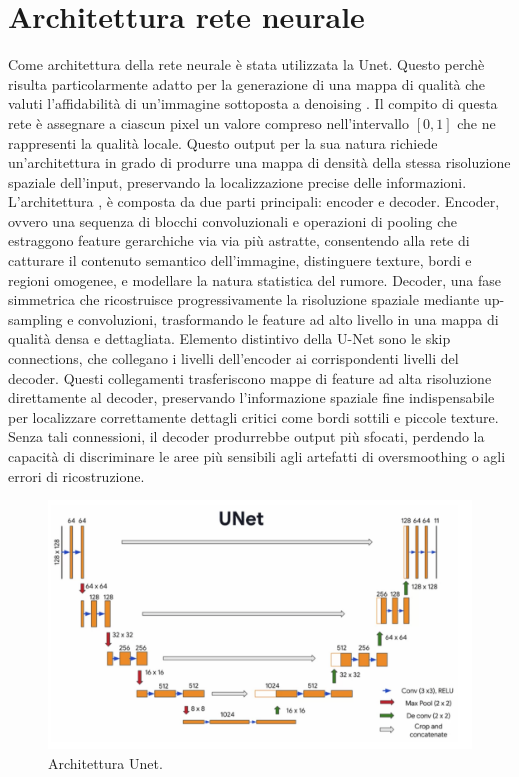 \section{Architettura rete neurale}
Come architettura della rete neurale è stata utilizzata la Unet. Questo perchè risulta particolarmente adatto per la 
generazione di una mappa di qualità che valuti l'affidabilità di un'immagine sottoposta a denoising \cite{Vyver2025}. Il compito di 
questa rete è assegnare a ciascun pixel un valore compreso nell'intervallo $[0,1]$ che ne rappresenti la 
qualità locale. Questo output per la sua natura richiede un'architettura in grado di produrre una mappa di densità 
della stessa risoluzione spaziale dell'input, preservando la localizzazione precise delle informazioni. 
L'architettura \cite{ronneberger2015unetconvolutionalnetworksbiomedical}, è composta da due parti principali: encoder e decoder. 
Encoder, ovvero una sequenza di blocchi convoluzionali e operazioni di pooling che estraggono feature 
gerarchiche via via più astratte, consentendo alla rete di catturare il contenuto semantico dell’immagine, 
distinguere texture, bordi e regioni omogenee, e modellare la natura statistica del rumore.
Decoder, una fase simmetrica che ricostruisce progressivamente la risoluzione spaziale 
mediante up-sampling e convoluzioni, trasformando le feature ad alto livello in una mappa di 
qualità densa e dettagliata.
Elemento distintivo della U-Net sono le skip connections, che collegano i livelli dell’encoder ai corrispondenti 
livelli del decoder. Questi collegamenti trasferiscono mappe di feature ad alta risoluzione direttamente al decoder, 
preservando l’informazione spaziale fine indispensabile per localizzare correttamente dettagli critici come bordi 
sottili e piccole texture. Senza tali connessioni, il decoder produrrebbe output più sfocati, perdendo la capacità 
di discriminare le aree più sensibili agli artefatti di oversmoothing o agli errori di ricostruzione.
\begin{figure}[H]
  \centering
  \includegraphics[width=\textwidth]{utils/unet.png}
  \caption{Architettura Unet.}
  \label{fig:ArchitetturaUnet}
\end{figure}
